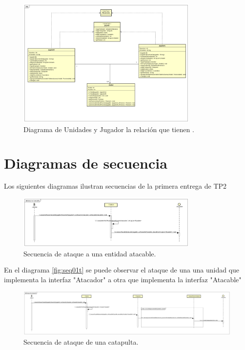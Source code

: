 \documentclass[titlepage,a4paper]{article}
\begin{document}
\begin{figure}[H]
\centering
\includegraphics[width=0.8\textwidth]{DiagramasDeSecuencia/JugadoresUnidad.png}
\caption{\label{fig:class01u}Diagrama de Unidades y Jugador la relación que tienen .}
\end{figure}


\section{Diagramas de secuencia}\label{sec:diagramasdesecuencia}
Los siguientes diagramas ilustran secuencias de la primera entrega de TP2

\begin{figure}[H]
\centering
\includegraphics[width=0.8\textwidth]{DiagramasDeSecuencia/28-nov atacar un atacable.jpg}
\caption{\label{fig:seq01y}Secuencia de ataque a una entidad atacable.}
\end{figure}

En el diagrama  \ref{fig:seq01t} se puede observar el ataque de una una unidad que implementa la interfaz "Atacador" a otra que implementa la interfaz "Atacable"


\begin{figure}[H]
\centering
\includegraphics[width=\textwidth]{DiagramasDeSecuencia/28-nov ataque de catapulta.jpg}
\caption{\label{fig:seq02r}Secuencia de ataque de una catapulta.}
\end{figure}
\end{document}
